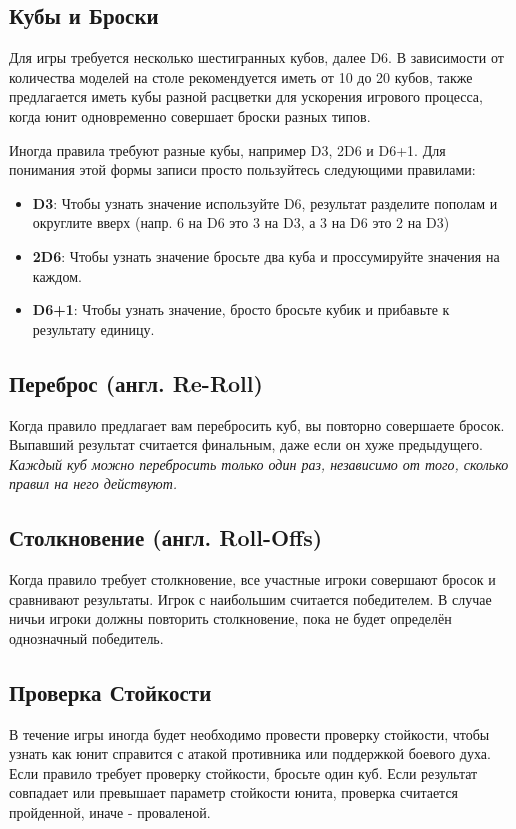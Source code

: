 \documentclass[twocolumn]{article}
\newcommand{\h}[1]{\textbf{#1}}
\newcommand{\D}[1][6]{D#1\xspace}
\begin{document}
\subsection{Кубы и Броски}
Для игры требуется несколько шестигранных кубов, далее \D[6]. В зависимости от количества моделей на столе рекомендуется иметь от 10 до 20 кубов, также предлагается иметь кубы разной расцветки для ускорения игрового процесса, когда юнит одновременно совершает броски разных типов.

Иногда правила требуют разные кубы, например \D[3], 2\D и \D+1. Для понимания этой формы записи просто пользуйтесь следующими правилами:

\begin{itemize}
    \item \h{\D[3]}: Чтобы узнать значение используйте \D, результат разделите пополам и округлите вверх (напр. 6 на \D  это 3 на \D[3], а 3 на \D это 2 на \D[3])
    \item \h{2\D}: Чтобы узнать значение бросьте два куба и проссумируйте значения на каждом.
    \item \h{\D[6]+1}: Чтобы узнать значение, бросто бросьте кубик и прибавьте к результату единицу.
\end{itemize}

\subsection{Переброс (англ. Re-Roll)}
Когда правило предлагает вам перебросить куб, вы повторно совершаете бросок. Выпавший результат считается финальным, даже если он хуже предыдущего. \emph{Каждый куб можно перебросить только один раз, независимо от того, сколько правил на него действуют.}

\subsection{Столкновение (англ. Roll-Offs)}
Когда правило требует столкновение, все участные игроки совершают бросок и сравнивают результаты. Игрок с наибольшим считается победителем. В случае ничьи игроки должны повторить столкновение, пока не будет определён однозначный победитель.

\subsection{Проверка Стойкости}
В течение игры иногда будет необходимо провести проверку стойкости, чтобы узнать как юнит справится с атакой противника или поддержкой боевого духа. Если правило требует проверку стойкости, бросьте один куб. Если результат совпадает или превышает параметр стойкости юнита, проверка считается пройденной, иначе - проваленой.
\end{document}

